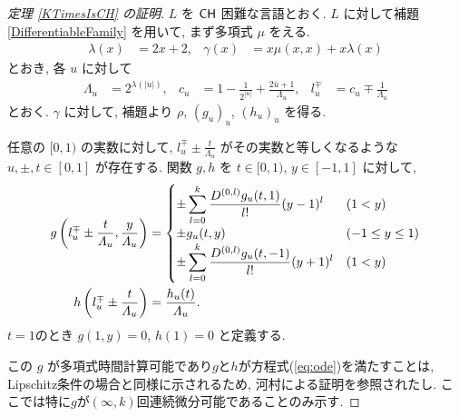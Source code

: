 \begin{proof}[\rm 定理 \ref{KTimesIsCH} の証明]
 $L$ を $\mathsf{CH}$ 困難な言語とおく.
 $L$ に対して補題 \ref{DifferentiableFamily} を用いて,
 まず多項式 $\mu$ をえる.
 \begin{align}
  \lambda(x) &= 2x + 2,&
  \gamma(x) &= x \mu(x, x) + x \lambda(x)
 \end{align}
 とおき, 各 $u$ に対して 
\begin{align}
 \Lambda_u 
 &= 2^{\lambda(|u|)}, &
 c_u 
 &= 1-\frac{1}{2^{|u|}}+\frac{2\bar{u}+1}{\Lambda_u}, &
 l_u^\mp 
 &= c_u\mp\frac{1}{\Lambda_u} 
\end{align}  
 とおく. 
 $\gamma$ に対して, 補題より $\rho$, $(g_u)_u$, $(h_u)_u$ を得る.


 任意の $[0,1)$ の実数に対して,
 $l^\mp_u \pm \frac{t}{\Lambda_u}$ がその実数と等しくなるような
 $u, \pm, t\in [0,1]$ が存在する.
 関数 $g, h$ を $t \in [0,1)$, $y \in [-1, 1]$ に対して,
 \begin{align}
 g \left(l^\mp_u \pm \frac{t}{\varLambda_u}, \frac{y}{\varLambda_u}\right)
  &= \begin{cases}
      \pm \displaystyle \sum_{l=0}^k \frac{D^{(0,l)}g_u(t,1)}{l!} (y-1)^l 
      &  (1<y) \\
      \pm g_u(t, y)      & (-1 \le y \le 1) \\
      \pm \displaystyle \sum_{l=0}^k \frac{D^{(0,l)}g_u(t,-1)}{l!} (y+1)^l  
      &  (1<y) \\
    \end{cases} 
  \\
 h \left( l^\mp_u \pm \frac{t}{\varLambda_u} \right) 
  & = \frac{h_u(t)}{\varLambda_u}.
\end{align}
 $t=1$のとき $g(1,y) = 0$, $h(1) = 0$ と定義する.

 この $g$ が多項式時間計算可能であり$g$と$h$が方程式(\ref{eq:ode})を満たすことは,
 Lipschitz条件の場合と同様に示されるため,
 河村による証明を参照されたし\cite[定理3.2]{kawamura2010lipschitz}.
 ここでは特に$g$が$(\infty, k)$回連続微分可能であることのみ示す.


\end{proof}
